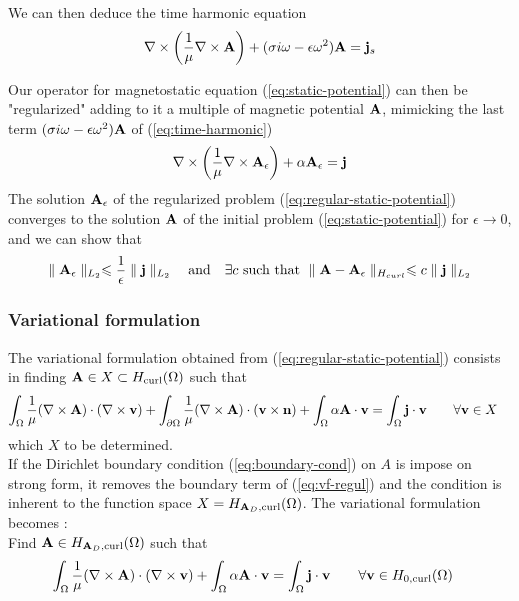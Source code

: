 We can then deduce the time harmonic equation
\begin{equation}
  \label{eq:time-harmonic}
  \nabla \times \left( \frac{1}{\mu} \nabla \times \mathbf{A} \right)
  + (\sigma i \omega - \epsilon \omega^2) \mathbf{A} = \mathbf{j}_s
\end{equation}

Our operator for magnetostatic equation (\ref{eq:static-potential}) can then be
"regularized" adding to it a multiple of magnetic potential $\mathbf{A}$, mimicking the
last term $(\sigma i \omega - \epsilon\omega^2) \mathbf{A}$ of (\ref{eq:time-harmonic})
\begin{equation}
  \label{eq:regular-static-potential}
  \nabla \times \left( \frac{1}{\mu} \nabla \times \mathbf{A}_{\epsilon} \right)
  + \alpha \mathbf{A}_{\epsilon} = \mathbf{j}
\end{equation}
The solution $\mathbf{A}_{\epsilon}$ of the regularized problem
(\ref{eq:regular-static-potential}) converges to the solution $\mathbf{A}$ of the
initial problem (\ref{eq:static-potential}) for $\epsilon \longrightarrow 0$,
and we can show that
\begin{equation}
  \label{eq:bounds-reg}
  \parallel \mathbf{A}_{\epsilon} \parallel_{L_2}
  \leqslant \frac{1}{\epsilon} \parallel \mathbf{j} \parallel_{L_2}
  \quad
  \text{and}
  \quad
  \exists c ~\text{such that}
  ~\parallel \mathbf{A} - \mathbf{A}_{\epsilon} \parallel_{H_{curl}}
  \leqslant c \parallel \mathbf{j} \parallel_{L_2}
\end{equation}

\subsubsection{Variational formulation}
The variational formulation obtained from (\ref{eq:regular-static-potential})
consists in finding $\mathbf{A} \in X \subset H_{\mathrm{curl}}(\Omega)$ such that
\begin{alignat}{2}
  \label{eq:vf-regul}
  \int_{\Omega}\frac{1}{\mu}(\nabla \times \mathbf{A}) \cdot (\nabla \times \mathbf{v})
  + \int_{\partial \Omega}\frac{1}{\mu} (\nabla\times\mathbf{A}) \cdot (\mathbf{v}\times\mathbf{n} )
  + \int_{\Omega}\alpha \mathbf{A} \cdot \mathbf{v}  &= \int_{\Omega} \mathbf{j} \cdot \mathbf{v}
  &&\quad \forall \mathbf{v} \in X
\end{alignat}
which $X$ to be determined. \\

If the Dirichlet boundary condition (\ref{eq:boundary-cond}) on $A$ is impose on
strong form, it removes the boundary term of (\ref{eq:vf-regul})
and the condition is inherent to the function space
$X = H_{\mathbf{A}_D,\mathrm{curl}}(\Omega)$. The variational formulation becomes :\\
Find $\mathbf{A} \in H_{\mathbf{A}_D,\mathrm{curl}}(\Omega)$ such that
\begin{alignat}{2}
  \label{eq:vf-regul-strong}
  \int_{\Omega}\frac{1}{\mu}(\nabla \times \mathbf{A}) \cdot (\nabla \times \mathbf{v})
  + \int_{\Omega}\alpha \mathbf{A} \cdot \mathbf{v}  &= \int_{\Omega} \mathbf{j} \cdot \mathbf{v}
  && \quad \forall \mathbf{v} \in H_{0,\mathrm{curl}}(\Omega)
\end{alignat}

